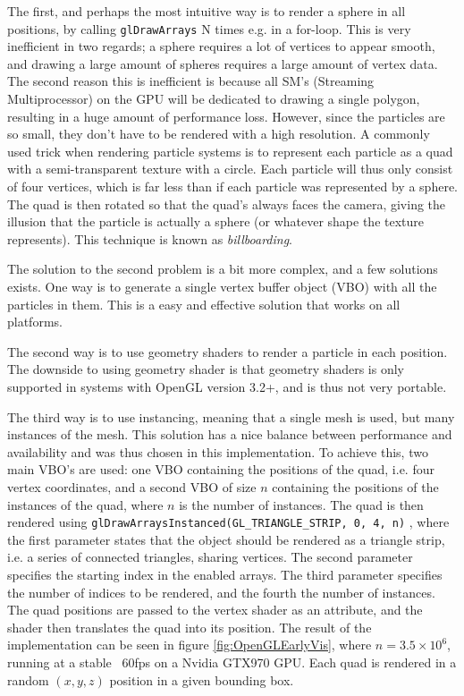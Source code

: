 The first, and perhaps the most intuitive way is to render a sphere in all positions, by calling \lstinline{glDrawArrays} N times e.g. in a for-loop. This is very inefficient in two regards; a sphere requires a lot of vertices to appear smooth, and drawing a large amount of spheres requires a large amount of vertex data. The second reason this is inefficient is because all SM's (Streaming Multiprocessor) on the GPU will be dedicated to drawing a single polygon, resulting in a huge amount of performance loss. However, since the particles are so small, they don't have to be rendered with a high resolution. A commonly used trick when rendering particle systems is to represent each particle as a quad with a semi-transparent texture with a circle. Each particle will thus only consist of four vertices, which is far less than if each particle was represented by a sphere. The quad is then rotated so that the quad's always faces the camera, giving the illusion that the particle is actually a sphere (or whatever shape the texture represents). This technique is known as \textit{billboarding}.


The solution to the second problem is a bit more complex, and a few solutions exists.
One way is to generate a single vertex buffer object (VBO) with all the particles in them. This is a easy and effective solution that works on all platforms. 

The second way is to use geometry shaders to render a particle in each position. The downside to using geometry shader is that geometry shaders is only supported in systems with OpenGL version 3.2+, and is thus not very portable. 

The third way is to use instancing, meaning that a single mesh is used, but many instances of the mesh. This solution has a nice balance between performance and availability and was thus chosen in this implementation. To achieve this, two main VBO's are used: one VBO containing the positions of the quad, i.e. four vertex coordinates, and a second VBO of size $n$ containing the positions of the instances of the quad, where $n$ is the number of instances. The quad is then rendered using \lstinline{glDrawArraysInstanced(GL_TRIANGLE_STRIP, 0, 4, n)} \cite{OpenCLDocs}, where the first parameter states that the object should be rendered as a triangle strip, i.e. a series of connected triangles, sharing vertices. The second parameter specifies the starting index in the enabled arrays. The third parameter specifies the number of indices to be rendered, and the fourth the number of instances. The quad positions are passed to the vertex shader as an attribute, and the shader then translates the quad into its position. The result of the implementation can be seen in figure \ref{fig:OpenGLEarlyVis}, where $n=3.5 \times 10^6$, running at a stable ~60fps on a Nvidia GTX970 GPU. Each quad is rendered in a random $(x,y,z)$ position in a given bounding box.


